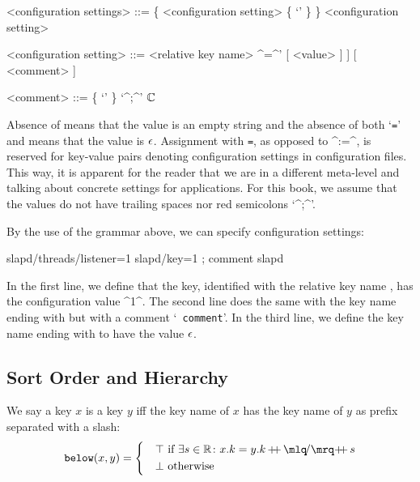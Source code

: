 \begin{grammar}
<configuration settings> ::= \{ <configuration setting> \{ \lq\LineBreak' \} \} <configuration setting>

<configuration setting> ::= <relative key name> \Big[ \lq\lstinline[language=CfgElektra]^=^' [ <value> ] \Big] [ <comment> ]

<comment> ::=  \{ \lq\WhiteSpace' \} \lq^;^' $\mathbb{C}$
\end{grammar}

Absence of  means that the value is an empty string and the absence of both \lq\lstinline[language=CfgElektra]^=^' and  means that the value is $\epsilon$.
Assignment with \lstinline[language=CfgElektra]^=^, as opposed to ^:=^, is reserved for key-value pairs denoting configuration settings in configuration files.
This way, it is apparent for the reader that we are in a different meta-level and talking about concrete settings for applications.
For this book, we assume that the values do not have trailing spaces nor red semicolons \lq^;^'.

\begin{example}
By the use of the grammar above, we can specify configuration settings:

\begin{code}[language=CfgElektra]
slapd/threads/listener=1
slapd/key=1 ; comment
slapd
\end{code}

In the first line, we define that the key, identified with the relative key name , has the configuration value ^1^.
The second line does the same with the key name ending with  but with a comment \lq{}{\color{purple}\texttt{ comment}}'.
In the third line, we define the key name ending with  to have the value $\epsilon$.
\end{example}

\subsection{Sort Order and Hierarchy}
\label{sec:approach-sort-order}

\begin{definition}
We say a key $x$ is  a key $y$ iff the key name of $x$ has the key name of $y$ as prefix separated with a slash:
\begin{align*}
\texttt{below}(x, y) =
\begin{dcases}
&\top \text{ if } \exists s \in \RelativeKeyNames \colon x.k = y.k \concat \mlq\!/\mrq\! \concat s \\
&\bot \text{ otherwise}
\end{dcases}
\end{align*}
\vspace{.3em}\enlargethispage{2em}
\end{definition}


